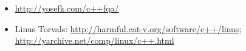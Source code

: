 \chapter{\CPP}





\section{}

\begin{itemize}

\item
\url{http://yosefk.com/c++fqa/}

\item
Linus Torvals: \url{http://harmful.cat-v.org/software/c++/linus}; \url{http://yarchive.net/comp/linux/c++.html}

\end{itemize}

